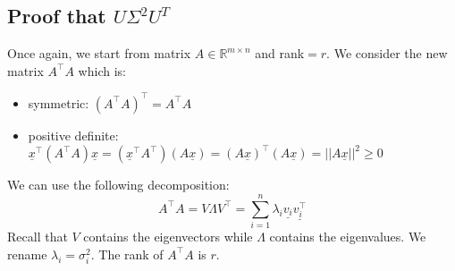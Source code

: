 \subsection*{Proof that $ U\Sigma^2 U^T$ }
Once again, we start from matrix $A \in \mathbb{R}^{m \times n}$ and rank$=r$. We consider the new matrix $A^\intercal A$ which is:
\begin{itemize}
    \item symmetric: $(A^\intercal A)^\intercal = A^\intercal A$
    \item positive definite: $\underline{x}^\intercal(A^\intercal A)\underline{x} = (\underline{x}^\intercal A^\intercal)(A \underline{x}) = (A\underline{x})^\intercal (A\underline{x}) = ||A\underline{x}||^2 \geq 0  $
\end{itemize} 
We can use the following decomposition:
\[
    A^\intercal A = V\Lambda V^\intercal = \sum_{i=1}^n \lambda_i \underline{v_i} \underline{v_i^\intercal}    
\]
Recall that $V$ contains the eigenvectors while $\Lambda$ contains the eigenvalues. We rename $\lambda_i = \sigma_i^2$. The rank of $A^\intercal A$ is $r$.\\

